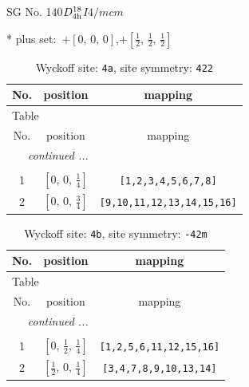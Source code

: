 \documentclass[fleqn,8pt]{jsarticle}
\begin{document}
\setcounter{MaxMatrixCols}{32}

\renewcommand{\tablename}{Table~}
\renewcommand{\figurename}{Figure~}
\begin{center}
\LARGE
SG No. 140\quad$D_{\rm 4h}^{18}$\quad$I4/mcm$\quad[ tetragonal ]
\end{center}
* plus set:\,\,\,$+\left[ 0,\, 0,\, 0 \right]$,\quad $+\left[ \frac{1}{2},\, \frac{1}{2},\, \frac{1}{2} \right]$
\renewcommand{\arraystretch}{1.2}
\begin{longtable}{ccc}
\caption{Wyckoff site: {\tt 4a}, site symmetry: {\tt 422}}
 \\
 \hline \hline
No. & position & mapping \\ \hline \endfirsthead

\multicolumn{2}{l}{\tablename\ \thetable{}} \\
 \hline \hline
No. & position & mapping \\ \hline \endhead

 \hline \hline
\multicolumn{2}{r}{\footnotesize\it continued ...} \\ \endfoot

 \hline \hline
\multicolumn{2}{r}{} \\ \endlastfoot

1 & $\left[ 0,\, 0,\, \frac{1}{4} \right]$ & {\tt [1,2,3,4,5,6,7,8]} \\ \hline
2 & $\left[ 0,\, 0,\, \frac{3}{4} \right]$ & {\tt [9,10,11,12,13,14,15,16]} \\
\end{longtable}
\renewcommand{\arraystretch}{1.2}
\begin{longtable}{ccc}
\caption{Wyckoff site: {\tt 4b}, site symmetry: {\tt -42m}}
 \\
 \hline \hline
No. & position & mapping \\ \hline \endfirsthead

\multicolumn{2}{l}{\tablename\ \thetable{}} \\
 \hline \hline
No. & position & mapping \\ \hline \endhead

 \hline \hline
\multicolumn{2}{r}{\footnotesize\it continued ...} \\ \endfoot

 \hline \hline
\multicolumn{2}{r}{} \\ \endlastfoot

1 & $\left[ 0,\, \frac{1}{2},\, \frac{1}{4} \right]$ & {\tt [1,2,5,6,11,12,15,16]} \\ \hline
2 & $\left[ \frac{1}{2},\, 0,\, \frac{1}{4} \right]$ & {\tt [3,4,7,8,9,10,13,14]} \\
\end{longtable}
\end{document}
